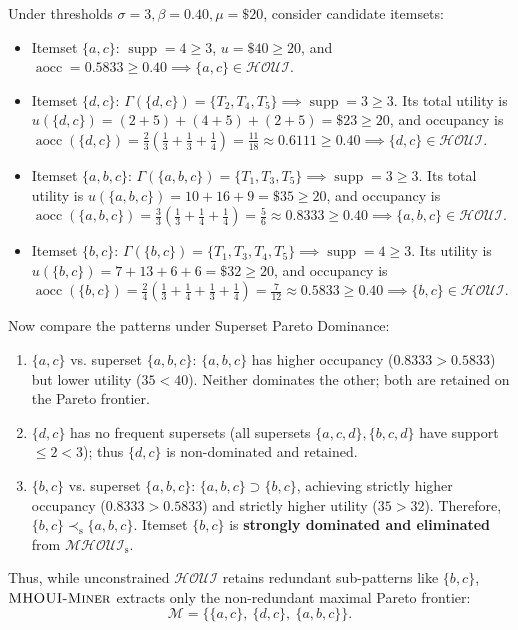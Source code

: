 \documentclass[runningheads]{llncs}
\newcommand{\HOUI}{\ensuremath{\mathcal{HOUI}}}
\newcommand{\MHOUI}{\ensuremath{\mathcal{MHOUI}_{\mathrm{s}}}}
\newcommand{\MHOUIminer}{\textsc{MHOUI-Miner}}
\newcommand{\supp}{\operatorname{supp}}
\newcommand{\aocc}{\operatorname{aocc}}
\begin{document}
\begin{example}
Under thresholds $\sigma = 3, \beta = 0.40, \mu = \$20$, consider candidate itemsets:
\begin{itemize}
    \item Itemset $\{a, c\}$: $\supp = 4 \ge 3$, $u = \$40 \ge 20$, and $\aocc = 0.5833 \ge 0.40 \implies \{a, c\} \in \HOUI$.
    \item Itemset $\{d, c\}$: $\Gamma(\{d, c\}) = \{T_2, T_4, T_5\} \implies \supp = 3 \ge 3$.
    Its total utility is $u(\{d, c\}) = (2+5) + (4+5) + (2+5) = \$23 \ge 20$, and occupancy is $\aocc(\{d, c\}) = \frac{2}{3}\left(\frac{1}{3} + \frac{1}{3} + \frac{1}{4}\right) = \frac{11}{18} \approx 0.6111 \ge 0.40 \implies \{d, c\} \in \HOUI$.
    \item Itemset $\{a, b, c\}$: $\Gamma(\{a, b, c\}) = \{T_1, T_3, T_5\} \implies \supp = 3 \ge 3$.
    Its total utility is $u(\{a, b, c\}) = 10 + 16 + 9 = \$35 \ge 20$, and occupancy is $\aocc(\{a, b, c\}) = \frac{3}{3}\left(\frac{1}{3} + \frac{1}{4} + \frac{1}{4}\right) = \frac{5}{6} \approx 0.8333 \ge 0.40 \implies \{a, b, c\} \in \HOUI$.
    \item Itemset $\{b, c\}$: $\Gamma(\{b, c\}) = \{T_1, T_3, T_4, T_5\} \implies \supp = 4 \ge 3$.
    Its utility is $u(\{b, c\}) = 7 + 13 + 6 + 6 = \$32 \ge 20$, and occupancy is $\aocc(\{b, c\}) = \frac{2}{4}(\frac{1}{3} + \frac{1}{4} + \frac{1}{3} + \frac{1}{4}) = \frac{7}{12} \approx 0.5833 \ge 0.40 \implies \{b, c\} \in \HOUI$.
\end{itemize}
Now compare the patterns under Superset Pareto Dominance:
\begin{enumerate}
    \item $\{a, c\}$ vs. superset $\{a, b, c\}$: $\{a, b, c\}$ has higher occupancy ($0.8333 > 0.5833$) but lower utility ($35 < 40$). Neither dominates the other; both are retained on the Pareto frontier.
    \item $\{d, c\}$ has no frequent supersets (all supersets $\{a, c, d\}, \{b, c, d\}$ have support $\le 2 < 3$); thus $\{d, c\}$ is non-dominated and retained.
    \item $\{b, c\}$ vs. superset $\{a, b, c\}$: $\{a, b, c\} \supset \{b, c\}$, achieving strictly higher occupancy ($0.8333 > 0.5833$) and strictly higher utility ($35 > 32$). Therefore, $\{b, c\} \prec_{\mathrm{s}} \{a, b, c\}$.
    Itemset $\{b, c\}$ is \textbf{strongly dominated and eliminated} from $\MHOUI$.
\end{enumerate}
Thus, while unconstrained $\HOUI$ retains redundant sub-patterns like $\{b, c\}$, $\MHOUIminer{}$ extracts only the non-redundant maximal Pareto frontier:
\begin{equation*}
\mathcal{M} = \{\{a, c\}, \ \{d, c\}, \ \{a, b, c\}\}.
\end{equation*}
\end{example}
\end{document}
